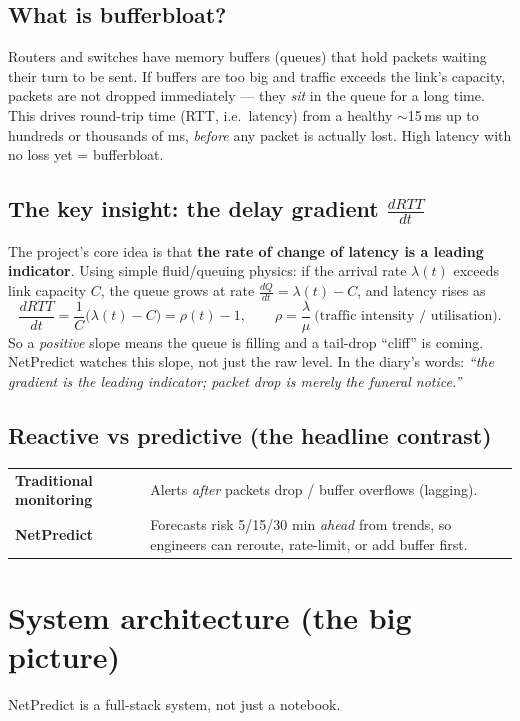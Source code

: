 \documentclass[11pt,a4paper]{article}
\begin{document}
\subsection{What is bufferbloat?}
Routers and switches have memory buffers (queues) that hold packets waiting their turn to be sent.
If buffers are too big and traffic exceeds the link's capacity, packets are not dropped immediately ---
they \emph{sit} in the queue for a long time. This drives round-trip time (RTT, i.e.\ latency) from a
healthy $\sim$15\,ms up to hundreds or thousands of ms, \emph{before} any packet is actually lost.
High latency with no loss yet = bufferbloat.

\subsection{The key insight: the delay gradient $\tfrac{dRTT}{dt}$}
The project's core idea is that \textbf{the rate of change of latency is a leading indicator}.
Using simple fluid/queuing physics: if the arrival rate $\lambda(t)$ exceeds link capacity $C$, the queue
grows at rate $\tfrac{dQ}{dt}=\lambda(t)-C$, and latency rises as
\[
\frac{dRTT}{dt}=\frac{1}{C}\big(\lambda(t)-C\big)=\rho(t)-1,
\qquad \rho=\frac{\lambda}{\mu}\ \text{(traffic intensity / utilisation)}.
\]
So a \emph{positive} slope means the queue is filling and a tail-drop ``cliff'' is coming. NetPredict watches
this slope, not just the raw level. In the diary's words: \emph{``the gradient is the leading indicator;
packet drop is merely the funeral notice.''}

\subsection{Reactive vs predictive (the headline contrast)}
\begin{center}
\begin{tabularx}{\linewidth}{@{}p{4.2cm}X@{}}
\toprule
\textbf{Traditional monitoring} & Alerts \emph{after} packets drop / buffer overflows (lagging). \\
\textbf{NetPredict} & Forecasts risk 5/15/30 min \emph{ahead} from trends, so engineers can reroute, rate-limit, or add buffer first. \\
\bottomrule
\end{tabularx}
\end{center}

\section{System architecture (the big picture)}
NetPredict is a full-stack system, not just a notebook.
\end{document}

